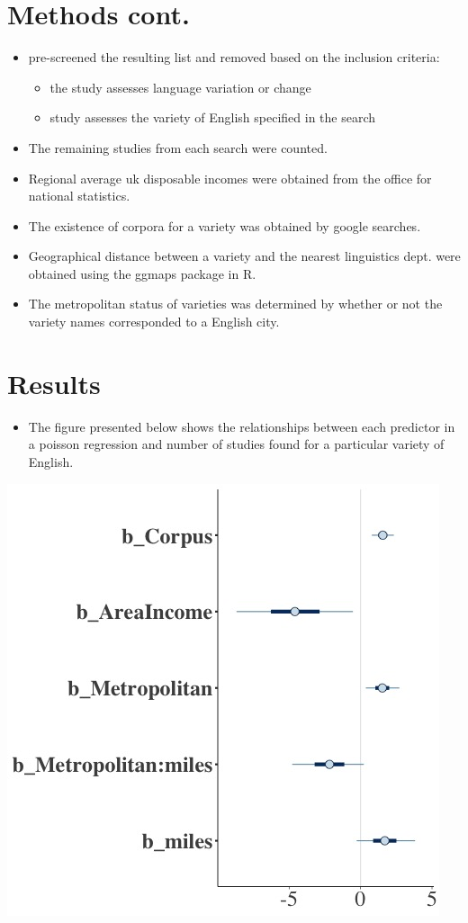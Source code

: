 \documentclass[a0paper,fleqn]{betterposter}
\begin{document}
{
	\section{Methods cont.}	
\begin{itemize}
	\item pre-screened the resulting list and removed based on the inclusion criteria:
	\begin{itemize}
		\item the study assesses language variation or change
		\item study assesses the variety of English specified in the search
	\end{itemize}
	\item The remaining studies from each search were counted.

	\item Regional average uk disposable incomes were obtained from the office for national statistics.
	\item The existence of corpora for a variety was obtained by google searches.
	\item Geographical distance between a variety and the nearest linguistics dept. were obtained using the ggmaps package in R.
	
	\item The metropolitan status of varieties was determined by whether or not the variety names corresponded to a English city.
\end{itemize}



\section{Results}


	\begin{itemize}
	\item The figure presented below shows the relationships between each predictor in a poisson regression and number of studies found for a particular variety of English. 
	\end{itemize}
	\includegraphics[scale=1]{new.jpg}
	

}
\end{document}
